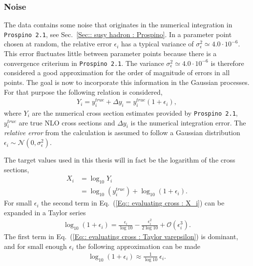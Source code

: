 \documentclass[twoside,english]{uiofysmaster}
\begin{document}
{{\subsubsection{Noise}\label{Sec:: evaluating cross : Noise in dataset}

The data contains some noise that originates in the numerical integration in \verb|Prospino 2.1|, see Sec.~\ref{Sec:: susy hadron : Prospino}. In a parameter point chosen at random, the relative error $\epsilon_i$ has a typical variance of $\sigma^2_{\epsilon} \simeq 4.0 \cdot 10^{-6}$. This error fluctuates little between parameter points because there is a convergence criterium in \verb|Prospino 2.1|. The variance $\sigma^2_{\epsilon} \simeq 4.0 \cdot 10^{-6}$ is therefore considered a good approximation for the order of magnitude of errors in all points. The goal is now to incorporate this information in the Gaussian processes. For that purpose the following relation is considered,
\begin{align}\label{Eq:: cross section w/ error}
Y_i = y^{true}_i + \Delta y_i = y_i^{true}(1 + \epsilon_i),
\end{align}
where $Y_i$ are the numerical cross section estimates provided by \verb|Prospino 2.1|, $y_i^{true}$ are true NLO cross sections and $\Delta y_i$ is the numerical integration error. The \textit{relative error} from the calculation is assumed to follow a Gaussian distribution $\epsilon_i \sim \mathcal{N}(0, \sigma_{\epsilon}^2)$. 

The target values used in this thesis will in fact be the logarithm of the cross sections, 
\begin{align}
X_i &= \log_{10} Y_i \nonumber \\
&= \log_{10}(y_i^{true})  + \log_{10}(1 + \epsilon_i).\label{Eq:: evaluating cross : X_i}
\end{align}
For small $\epsilon_i$ the second term in Eq.~(\ref{Eq:: evaluating cross : X_i}) can be expanded in a Taylor series
\begin{align}\label{Eq:: evaluating cross : Taylor varepsilon}
\log_{10}(1 + \epsilon_i) = \frac{\epsilon_i}{\log 10} - \frac{\epsilon_i^2}{2 \log 10} + \mathcal{O}(\epsilon_i^3). 
\end{align} 
The first term in Eq.~(\ref{Eq:: evaluating cross : Taylor varepsilon}) is dominant, and for small enough $\epsilon_i$ the following approximation can be made
\begin{align}
\log_{10}(1 + \epsilon_i) \approx \frac{1}{\log 10} ~\epsilon_i.
\end{align}

}}
\end{document}

